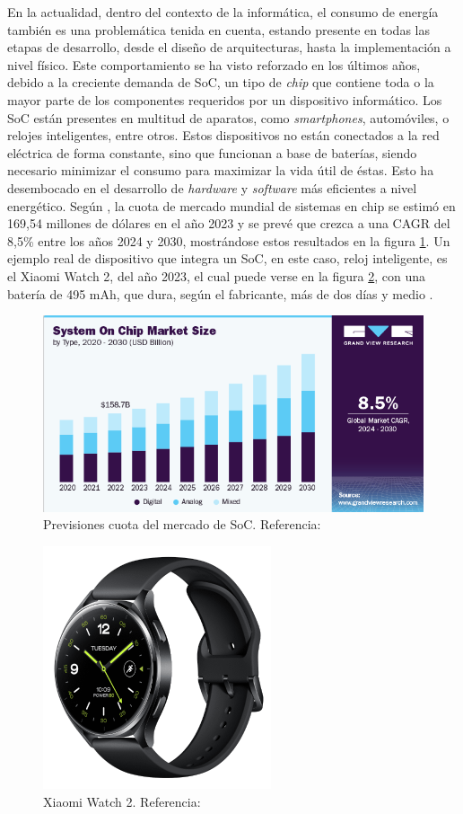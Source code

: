 En la actualidad, dentro del contexto de la informática, el consumo de energía también es una problemática tenida en cuenta, estando presente en todas las etapas de desarrollo, desde el diseño de arquitecturas, hasta la implementación a nivel físico. Este comportamiento se ha visto reforzado en los últimos años, debido a la creciente demanda de \ac{SoC}, un tipo de \textit{chip} que contiene toda o la mayor parte de los componentes requeridos por un dispositivo informático. Los \ac{SoC} están presentes en multitud de aparatos, como \textit{smartphones}, automóviles, o relojes inteligentes, entre otros. Estos dispositivos no están conectados a la red eléctrica de forma constante, sino que funcionan a base de baterías, siendo necesario minimizar el consumo para maximizar la vida útil de éstas. Esto ha desembocado en el desarrollo de \textit{hardware} y \textit{software} más eficientes a nivel energético. Según \cite{mercadoSoc}, la cuota de mercado mundial de sistemas en chip se estimó en 169,54 millones de dólares en el año 2023 y se prevé que crezca a una \ac{CAGR} del 8,5\% entre los años 2024 y 2030, mostrándose estos resultados en la figura \ref{previsionesSoc}. Un ejemplo real de dispositivo que integra un \ac{SoC}, en este caso, reloj inteligente, es el Xiaomi Watch 2, del año 2023, el cual puede verse en la figura \ref{xiaomiReloj}, con una batería de 495 mAh, que dura, según el fabricante, más de dos días y medio \cite{xiaomiWatch}.

\begin{figure}[H]
    \centering
    \includegraphics[width=0.95\linewidth, height=0.5\textwidth]{figs/graficaSoc.png}
    \caption{Previsiones cuota del mercado de SoC. Referencia: \cite{mercadoSoc}}
    \label{previsionesSoc}
\end{figure}

\begin{figure}[H]
    \centering
    \includegraphics[width=0.3\linewidth, height=0.3\textwidth]{figs/relojinteligente.png}
    \caption{Xiaomi Watch 2. Referencia: \cite{xiaomiWatch}}
    \label{xiaomiReloj}
\end{figure}

